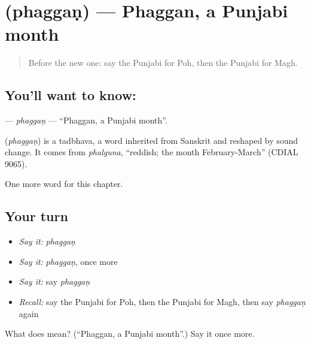 \section[\texorpdfstring{\pa{ਫੱਗਣ} (phaggaṇ)}{ਫੱਗਣ (phaggaṇ)}]{ (phaggaṇ) — Phaggan, a Punjabi month}

\label{lesson:PA-C105-phaggan}



\begin{quote}
Before the new one: say the Punjabi for Poh, then the Punjabi for Magh.
\end{quote}

\subsection*{You'll want to know: }
\textbf{} — \emph{phaggaṇ} — \textquotedblleft{}Phaggan, a Punjabi month\textquotedblright{}.

\begin{cousinweb}
\textbf{} (\emph{phaggaṇ}) is a tadbhava, a word inherited from Sanskrit and reshaped by sound change. It comes from \emph{phalguna}, \textquotedblleft{}reddish; the month February-March\textquotedblright{} (CDIAL 9065).
\end{cousinweb}

\begin{grammarlens}[title={What you've built}]
One more word for this chapter.
\end{grammarlens}

\subsection*{Your turn}
\begin{itemize}
\raggedright
  \item \emph{Say it:} \emph{phaggaṇ}
  \item \emph{Say it:} \emph{phaggaṇ}, once more
  \item \emph{Say it:} say \emph{phaggaṇ}
  \item \emph{Recall:} say the Punjabi for Poh, then the Punjabi for Magh, then say \emph{phaggaṇ} again
\end{itemize}

\begin{tcolorbox}[breakable,colback=teal!4,colframe=teal!35!black,title={Before you move on}]
What does  mean? (\textquotedblleft{}Phaggan, a Punjabi month\textquotedblright{}.) Say it once more.
\end{tcolorbox}
